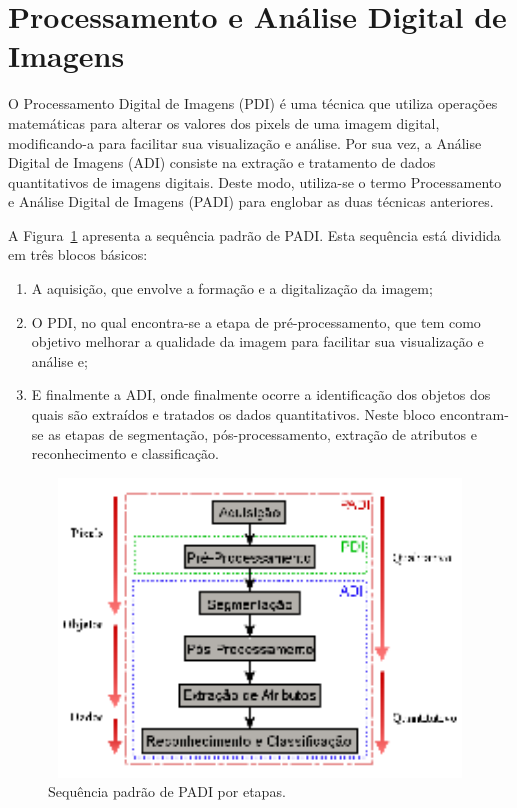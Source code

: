 \section{Processamento e Análise Digital de Imagens}

O Processamento Digital de Imagens (PDI) é uma técnica que utiliza
operações matemáticas para alterar os valores dos pixels de uma imagem
digital, modificando-a para facilitar sua visualização e análise. Por
sua vez, a Análise Digital de Imagens (ADI) consiste na extração e
tratamento de dados quantitativos de imagens digitais. Deste modo,
utiliza-se o termo Processamento e Análise Digital de Imagens (PADI)
para englobar as duas técnicas anteriores.\cite{72}

A Figura~\ref{fig:2-4} apresenta a sequência padrão de
PADI.\cite{35,52,72,73} Esta sequência está dividida em três blocos
básicos:

\begin{enumerate}[label=(\roman{*})]
  \item A aquisição, que envolve a formação e a digitalização da imagem;
  \item O PDI, no qual encontra-se a etapa de pré-processamento, que
    tem como objetivo melhorar a qualidade da imagem para facilitar
    sua visualização e análise e;
  \item E finalmente a ADI, onde finalmente ocorre a identificação dos
    objetos dos quais são extraídos e tratados os dados
    quantitativos. Neste bloco encontram-se as etapas de segmentação,
    pós-processamento, extração de atributos e reconhecimento e
    classificação.
\end{enumerate}

\begin{figure} [h]
  \begin{center}
    \includegraphics[height=225pt,width=350pt]{images/fig2-4}
    \caption{Sequência padrão de PADI por etapas.\cite{52}}\label{fig:2-4}
  \end{center}
\end{figure}

